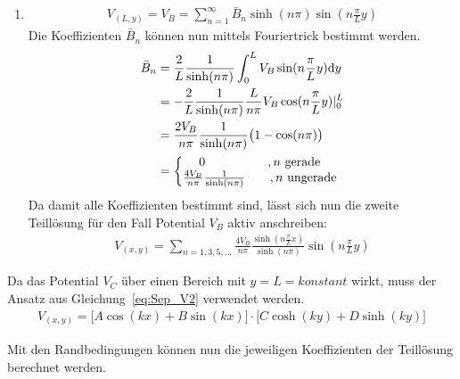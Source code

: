 \begin{enumerate}
	\item \begin{align}
		V_{(L,y)} = V_B = \sum_{n=1}^\infty \bar{B}_n \sinh(n \pi) \sin(n \frac{\pi}{L}y)
	\end{align}
	Die Koeffizienten $\bar{B}_n$ können nun mittels \glqq Fouriertrick\grqq{} bestimmt werden. 
	\begin{align}
		\bar{B}_n &= \frac{2}{L} \frac{1}{\sinh(n \pi)} \int_0^L V_B \sin(n \frac{\pi}{L}y) \mathrm{d}y \\
		&= -\frac{2}{L} \frac{1}{\sinh(n \pi)} \frac{L}{n \pi} V_B \cos(n \frac{\pi}{L}y) |_0^L \notag \\
		&= \frac{2V_B}{n \pi} \frac{1}{\sinh(n \pi)} \bigl(1 - \cos(n \pi)\big) \notag \\
		&= \biggl\{ \begin{matrix}
			0 \qquad \qquad \quad , n~\mathrm{gerade} \\
			\frac{4V_B}{n \pi} \frac{1}{\sinh(n \pi)} \qquad , n~\mathrm{ungerade}
		\end{matrix} \notag
	\end{align}
	Da damit alle Koeffizienten bestimmt sind, lässt sich nun die zweite Teillösung für den Fall Potential $V_B$ aktiv anschreiben:
	\begin{align}
		V_{(x,y)} = \sum_{n = 1,3,5,...} \frac{4V_B}{n \pi} \frac{\sinh(n \frac{\pi}{L}x)}{\sinh(n \pi)} \sin(n \frac{\pi}{L}y) \label{eq:V_Teil1_2}
	\end{align}
\end{enumerate}

Da das Potential $V_C$ über einen Bereich mit $y = L = konstant$ wirkt, muss der Ansatz aus Gleichung~\ref{eq:Sep_V2} verwendet werden. 
\begin{align}
	V_{(x,y)} = \bigl[A\cos(kx) + B\sin(kx)\bigr] \cdot \bigl[C\cosh(ky) + D\sinh(ky)\bigr]
\end{align}

Mit den Randbedingungen können nun die jeweiligen Koeffizienten der Teillösung berechnet werden. 

